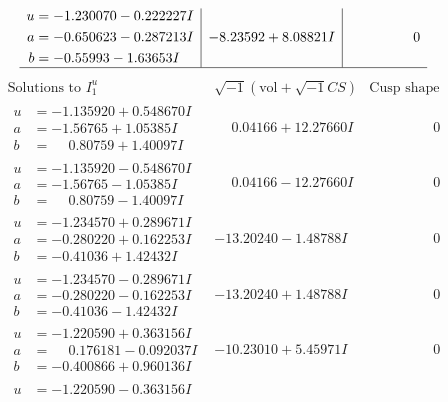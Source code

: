 \documentclass[1p]{elsarticle_modified}
\theoremstyle{definition}
\newcommand{\I}{\sqrt{-1}}
\begin{document}
$$\begin{array}{c|c|c}
\begin{aligned}
u &= -1.230070 - 0.222227 I \\
a &= -0.650623 - 0.287213 I \\
b &= -0.55993 - 1.63653 I\end{aligned}
 & -8.23592 + 8.08821 I & \phantom{-0.000000 } 0\\
 \hline 
 \end{array}$$\newpage$$\begin{array}{c|c|c}  
\text{Solutions to }I^u_{1}& \I (\text{vol} + \sqrt{-1}CS) & \text{Cusp shape}\\
 \hline 
\begin{aligned}
u &= -1.135920 + 0.548670 I \\
a &= -1.56765 + 1.05385 I \\
b &= \phantom{-}0.80759 + 1.40097 I\end{aligned}
 & \phantom{-}0.04166 + 12.27660 I & \phantom{-0.000000 } 0 \\ \hline\begin{aligned}
u &= -1.135920 - 0.548670 I \\
a &= -1.56765 - 1.05385 I \\
b &= \phantom{-}0.80759 - 1.40097 I\end{aligned}
 & \phantom{-}0.04166 - 12.27660 I & \phantom{-0.000000 } 0 \\ \hline\begin{aligned}
u &= -1.234570 + 0.289671 I \\
a &= -0.280220 + 0.162253 I \\
b &= -0.41036 + 1.42432 I\end{aligned}
 & -13.20240 - 1.48788 I & \phantom{-0.000000 } 0 \\ \hline\begin{aligned}
u &= -1.234570 - 0.289671 I \\
a &= -0.280220 - 0.162253 I \\
b &= -0.41036 - 1.42432 I\end{aligned}
 & -13.20240 + 1.48788 I & \phantom{-0.000000 } 0 \\ \hline\begin{aligned}
u &= -1.220590 + 0.363156 I \\
a &= \phantom{-}0.176181 - 0.092037 I \\
b &= -0.400866 + 0.960136 I\end{aligned}
 & -10.23010 + 5.45971 I & \phantom{-0.000000 } 0 \\ \hline\begin{aligned}
u &= -1.220590 - 0.363156 I \\

\end{aligned}
\end{array}$$
\end{document}
